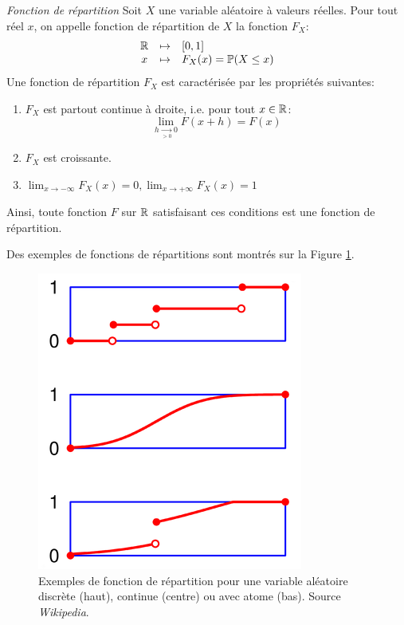 \begin{definition}{\textit{Fonction de répartition}}
Soit $X$ une variable aléatoire à valeurs réelles. Pour tout réel $x$, on appelle fonction de répartition de $X$ la fonction $F_X$:
\begin{align*}
\begin{array}{ccl}
\mathbb{R} &\mapsto& [0, 1]\\
x &\mapsto& F_X(x) = \mathbb{P}(X \leq x)
\end{array}
\end{align*}
Une fonction de répartition $F_X$ est caractérisée par les propriétés suivantes:
\begin{enumerate}
\item $F_X$ est partout continue à droite, i.e. pour tout $x\in \mathbb{R}$: $$\lim_{h \underset{>0}{\rightarrow} 0} F(x + h) = F(x)$$
\item $F_X$ est croissante.
\item $\lim_{x \rightarrow -\infty}F_X(x) = 0, \lim_{x \rightarrow +\infty}F_X(x) = 1$
\end{enumerate}
Ainsi, toute fonction $F$ sur $\mathbb{R}$ satisfaisant ces conditions est une fonction de répartition.

Des exemples de fonctions de répartitions sont montrés sur la Figure \ref{fig:fonc:rep}.
\end{definition}
\begin{figure}[ht]
\centering
\includegraphics[height = 0.3\textheight]{figures/fonction_repartition}
\caption{\label{fig:fonc:rep} Exemples de fonction de répartition pour une variable aléatoire discrète (haut), continue (centre) ou avec atome (bas). Source \textit{Wikipedia}.}
\end{figure}

